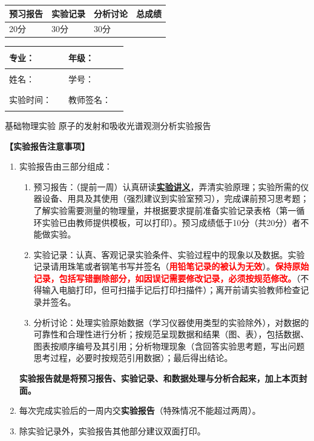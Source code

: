 \documentclass[dvipsnames, svgnames,a4paper,11pt]{article}
\begin{document}
\begin{table}
	\renewcommand\arraystretch{1.7}
	\begin{tabularx}{\textwidth}{
		|X|X|X|X
		|X|X|X|X|}
	\hline
	\multicolumn{2}{|c|}{预习报告}&\multicolumn{2}{|c|}{实验记录}&\multicolumn{2}{|c|}{分析讨论}&\multicolumn{2}{|c|}{总成绩}\\
	\hline
20分	& & 30分& & 30分& & & \\
	\hline
	\end{tabularx}
\end{table}


\begin{table}
	\renewcommand\arraystretch{1.7}
	\begin{tabularx}{\textwidth}{|X|X|X|X|}
	\hline
	专业：& \rule{2.5cm}{0.4pt} &年级：& \rule{2.5cm}{0.4pt} \\
	\hline
	姓名：& \rule{2.5cm}{0.4pt}   & 学号： &\rule{3cm}{0.4pt} \\
	\hline
	实验时间：& \rule{3cm}{0.4pt} & 教师签名：& \rule{3cm}{0.4pt} \\
	\hline
	\end{tabularx}
\end{table}

\begin{center}
	\LARGE 基础物理实验 \quad 原子的发射和吸收光谱观测分析实验报告
\end{center}

\textbf{【实验报告注意事项】}
\begin{enumerate}
	\item 实验报告由三部分组成：
	\begin{enumerate}
		\item 预习报告：（提前一周）认真研读\underline{\textbf{实验讲义}}，弄清实验原理；实验所需的仪器设备、用具及其使用（强烈建议到实验室预习），完成课前预习思考题；了解实验需要测量的物理量，并根据要求提前准备实验记录表格（第一循环实验已由教师提供模板，可以打印）。预习成绩低于10分（共20分）者不能做实验。
	    \item 实验记录：认真、客观记录实验条件、实验过程中的现象以及数据。实验记录请用珠笔或者钢笔书写并签名（\textcolor{red}{\textbf{用铅笔记录的被认为无效}}）。\textcolor{red}{\textbf{保持原始记录，包括写错删除部分，如因误记需要修改记录，必须按规范修改。}}（不得输入电脑打印，但可扫描手记后打印扫描件）；离开前请实验教师检查记录并签名。
	    \item 分析讨论：处理实验原始数据（学习仪器使用类型的实验除外），对数据的可靠性和合理性进行分析；按规范呈现数据和结果（图、表），包括数据、图表按顺序编号及其引用；分析物理现象（含回答实验思考题，写出问题思考过程，必要时按规范引用数据）；最后得出结论。
	\end{enumerate}
	\textbf{实验报告就是将预习报告、实验记录、和数据处理与分析合起来，加上本页封面。}
	\item 每次完成实验后的一周内交\textbf{实验报告}（特殊情况不能超过两周）。
	\item 除实验记录外，实验报告其他部分建议双面打印。
\end{enumerate}
\end{document}
